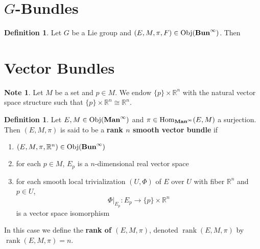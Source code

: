 \documentclass{book}
\theoremstyle{definition}
\newtheorem{defn}[definition]{Definition}
\newtheorem{note}[definition]{Note}
\newcommand{\R}{\mathbb{R}}
\DeclareMathOperator{\Obj}{Obj}
\DeclareMathOperator{\Hom}{Hom}
\DeclareMathOperator{\rnk}{rank}
\DeclareMathOperator*{\Maninf}{\text{\tbf{Man}}^{\infty}}
\DeclareMathOperator*{\Buninf}{\text{\tbf{Bun}}^{\infty}}
\DeclareMathOperator*{\0}{\mbf{0}}
\DeclareMathOperator*{\1}{\mbf{1}}
\newcommand{\tbf}[1]{\textbf{#1}}
\begin{document}
\newpage
\section{$G$-Bundles}

\begin{defn}
	Let $G$ be a Lie group and $(E, M, \pi, F) \in \Obj(\Buninf)$. Then  
\end{defn}


	































	\newpage
	\section{Vector Bundles}

	\begin{note}
		Let $M$ be a set and $p \in M$. We endow $\{p\} \times \R^n$ with the natural vector space structure such that $\{p\} \times \R^n \cong \R^n$.
	\end{note}

	\begin{defn}
		Let $E,M \in \Obj(\Maninf)$ and $\pi \in \Hom_{\Maninf}(E, M)$ a surjection. Then $(E, M, \pi)$ is said to be a \tbf{rank $n$ smooth vector bundle} if 
		\begin{enumerate}
			\item $(E, M, \pi, \R^n) \in \Obj(\Buninf)$
			\item for each $p \in M$, $E_p$ is a $n$-dimensional real vector space
			\item for each smooth local trivialization $(U, \Phi)$ of $E$ over $U$ with fiber $\R^n$ and $p \in U$, $$\Phi|_{E_p}: E_p \rightarrow \{p\} \times \R^n$$ is a vector space isomorphism
		\end{enumerate}
		In this case we define the \tbf{rank of $(E, M, \pi)$}, denoted $\rnk (E, M, \pi)$ by $ \rnk (E, M, \pi) = n$.
	\end{defn}
\end{document}
